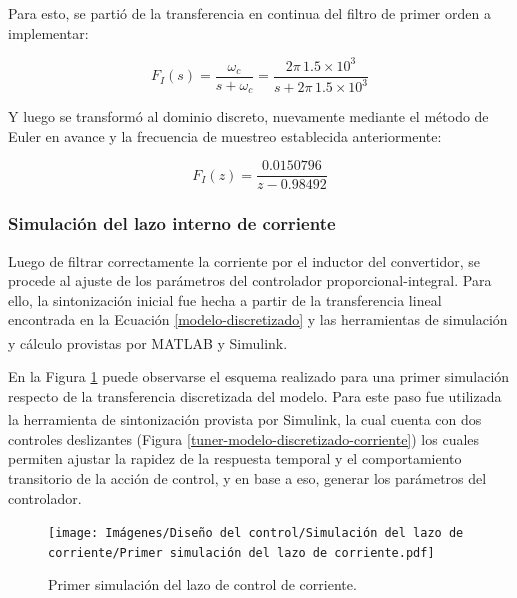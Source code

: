 Para esto, se partió de la transferencia en continua del filtro de primer orden a implementar:

\begin{equation}
  F_I(s) = \frac{\omega_c}{s+\omega_c} = \frac{2\pi \, 1.5 \times 10^3 }{s+ 2\pi \, 1.5 \times 10^3}
\end{equation}

Y luego se transformó al dominio discreto, nuevamente mediante el método de Euler en avance y la frecuencia de muestreo establecida anteriormente:

\begin{equation}
  \boxed{F_I(z) = \frac{0.0150796}{z-0.98492}}
  \label{filtro-corriente-discretizado}
\end{equation}

\subsubsection{Simulación del lazo interno de corriente}

Luego de filtrar correctamente la corriente por el inductor del convertidor, se procede al ajuste de los parámetros del controlador proporcional-integral. Para ello, la sintonización inicial fue hecha a partir de la transferencia lineal encontrada en la Ecuación \ref{modelo-discretizado} y las herramientas de simulación y cálculo provistas por MATLAB\textsuperscript\textregistered \hspace{0.6pt} y Simulink\textsuperscript\textregistered.

En la Figura \ref{simulacion-modelo-discretizado-corriente} puede observarse el esquema realizado para una primer simulación respecto de la transferencia discretizada del modelo. Para este paso fue utilizada la herramienta de sintonización provista por Simulink\textsuperscript\textregistered, la cual cuenta con dos controles deslizantes (Figura \ref{tuner-modelo-discretizado-corriente}) los cuales permiten ajustar la rapidez de la respuesta temporal y el comportamiento transitorio de la acción de control, y en base a eso, generar los parámetros del controlador.

\begin{figure}[hbt!]
  \centering
  \texttt{[image: Imágenes/Diseño del control/Simulación del lazo de corriente/Primer simulación del lazo de corriente.pdf]}
  \caption{Primer simulación del lazo de control de corriente.}
  \label{simulacion-modelo-discretizado-corriente}
\end{figure} 

